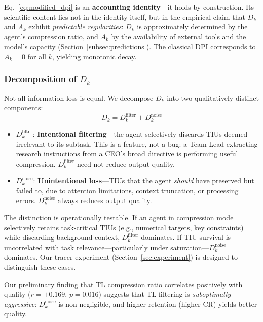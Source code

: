 \documentclass[conference]{IEEEtran}
\begin{document}
Eq.~\ref{eq:modified_dpi} is an \textbf{accounting identity}---it holds by construction.
Its scientific content lies not in the identity itself, but in the empirical claim that $D_k$ and $A_k$ exhibit \emph{predictable regularities}: $D_k$ is approximately determined by the agent's compression ratio, and $A_k$ by the availability of external tools and the model's capacity (Section~\ref{subsec:predictions}).
The classical DPI corresponds to $A_k = 0$ for all $k$, yielding monotonic decay.

\subsubsection{Decomposition of $D_k$}

Not all information loss is equal.
We decompose $D_k$ into two qualitatively distinct components:
\begin{equation}
    D_k = D_k^{\text{filter}} + D_k^{\text{noise}}
    \label{eq:dk_decompose}
\end{equation}

\begin{itemize}
    \item $D_k^{\text{filter}}$: \textbf{Intentional filtering}---the agent selectively discards TIUs deemed irrelevant to its subtask.
    This is a feature, not a bug: a Team Lead extracting research instructions from a CEO's broad directive is performing useful compression.
    $D_k^{\text{filter}}$ need not reduce output quality.
    \item $D_k^{\text{noise}}$: \textbf{Unintentional loss}---TIUs that the agent \emph{should} have preserved but failed to, due to attention limitations, context truncation, or processing errors.
    $D_k^{\text{noise}}$ always reduces output quality.
\end{itemize}

The distinction is operationally testable.
If an agent in compression mode selectively retains task-critical TIUs (e.g., numerical targets, key constraints) while discarding background context, $D_k^{\text{filter}}$ dominates.
If TIU survival is uncorrelated with task relevance---particularly under saturation---$D_k^{\text{noise}}$ dominates.
Our tracer experiment (Section~\ref{sec:experiment}) is designed to distinguish these cases.

Our preliminary finding that TL compression ratio correlates positively with quality ($r = +0.169$, $p = 0.016$) suggests that TL filtering is \emph{suboptimally aggressive}: $D_k^{\text{noise}}$ is non-negligible, and higher retention (higher CR) yields better quality.
\end{document}
